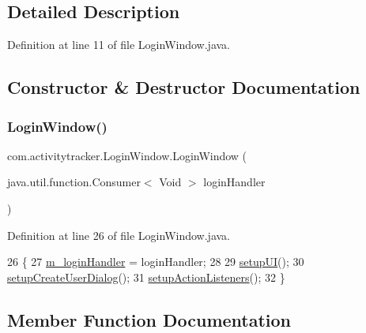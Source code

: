 \subsection{Detailed Description}


Definition at line 11 of file Login\+Window.\+java.



\subsection{Constructor \& Destructor Documentation}
\mbox{\label{classcom_1_1activitytracker_1_1_login_window_a137cce127ffa1660c70d3fddbc0e2a74}} 
\subsubsection{\texorpdfstring{Login\+Window()}{LoginWindow()}}
{\footnotesize\ttfamily com.\+activitytracker.\+Login\+Window.\+Login\+Window (\begin{DoxyParamCaption}\item[{java.\+util.\+function.\+Consumer$<$ Void $>$}]{login\+Handler }\end{DoxyParamCaption})\hspace{0.3cm}{\ttfamily [package]}}



Definition at line 26 of file Login\+Window.\+java.


\begin{DoxyCode}
26                                                                 \{
27         \mbox{\hyperlink{classcom_1_1activitytracker_1_1_login_window_aab28a8e6372499a8690d524dedeaf9e1}{m\_loginHandler}} = loginHandler;
28 
29         \mbox{\hyperlink{classcom_1_1activitytracker_1_1_login_window_a7af9edf52b3028437e2159f0be9893a9}{setupUI}}();
30         \mbox{\hyperlink{classcom_1_1activitytracker_1_1_login_window_a567db7b15448fe9d9c76addbcee4092b}{setupCreateUserDialog}}();
31         \mbox{\hyperlink{classcom_1_1activitytracker_1_1_login_window_af1ff236b841c51bfb49e143344a3c3ac}{setupActionListeners}}();
32     \}
\end{DoxyCode}


\subsection{Member Function Documentation}
\mbox{\label{classcom_1_1activitytracker_1_1_login_window_ab1ea45e86bbb79bccd06531279f1e443}} 
